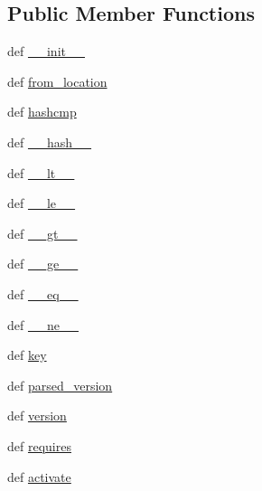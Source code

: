 \subsection*{Public Member Functions}
\begin{DoxyCompactItemize}
\item 
def \hyperlink{classpkg__resources_1_1Distribution_afb3f580d401dd0f68c6f1baa7c9c4ef8}{\+\_\+\+\_\+init\+\_\+\+\_\+}
\item 
def \hyperlink{classpkg__resources_1_1Distribution_ad1a81b8e74455dc9c2a4bbc765a52c18}{from\+\_\+location}
\item 
def \hyperlink{classpkg__resources_1_1Distribution_a31f43589452973a46d746e655ff57b8f}{hashcmp}
\item 
def \hyperlink{classpkg__resources_1_1Distribution_ae9b0973737f630ea8e8f9743e5ec8cbd}{\+\_\+\+\_\+hash\+\_\+\+\_\+}
\item 
def \hyperlink{classpkg__resources_1_1Distribution_a9f4b55ac5caaf8eaf372bf6538c03eea}{\+\_\+\+\_\+lt\+\_\+\+\_\+}
\item 
def \hyperlink{classpkg__resources_1_1Distribution_a4bbe596e0b1dcb9c0532c84dee490845}{\+\_\+\+\_\+le\+\_\+\+\_\+}
\item 
def \hyperlink{classpkg__resources_1_1Distribution_aafe3e80f7eb9cef285b0c35bb22fb31f}{\+\_\+\+\_\+gt\+\_\+\+\_\+}
\item 
def \hyperlink{classpkg__resources_1_1Distribution_af38db68863b216bf4df8113addaee4bd}{\+\_\+\+\_\+ge\+\_\+\+\_\+}
\item 
def \hyperlink{classpkg__resources_1_1Distribution_a08523388d7d58e96d7804bdfcd3cde6d}{\+\_\+\+\_\+eq\+\_\+\+\_\+}
\item 
def \hyperlink{classpkg__resources_1_1Distribution_a5d5876bd7b886f275af6d4eefeb55771}{\+\_\+\+\_\+ne\+\_\+\+\_\+}
\item 
def \hyperlink{classpkg__resources_1_1Distribution_af60cf2d519ee0d70314b672155cee731}{key}
\item 
def \hyperlink{classpkg__resources_1_1Distribution_ae3d4a6deb8fd3db572c283f25961f339}{parsed\+\_\+version}
\item 
def \hyperlink{classpkg__resources_1_1Distribution_afb2c936cd1c9d6d2958a14093acbcd5a}{version}
\item 
def \hyperlink{classpkg__resources_1_1Distribution_a0b5db0ca19eb8ea1564b1139d2be214d}{requires}
\item 
def \hyperlink{classpkg__resources_1_1Distribution_a9abb6a1ff1d4faef48bfb488e09d530e}{activate}
\item 

\end{DoxyCompactItemize}
